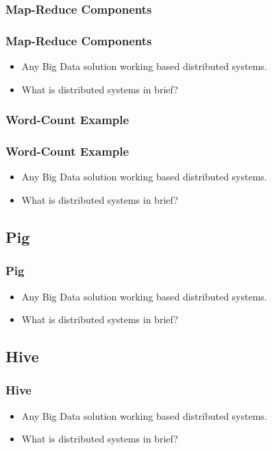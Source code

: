 
\subsubsection{Map-Reduce Components}
\begin{frame}
\frametitle{Map-Reduce Components}
\begin{itemize}[<+->]
	\item Any Big Data solution working based distributed systems.
	\item What is distributed systems in brief?
\end{itemize}
\end{frame}


\subsubsection{Word-Count Example}
\begin{frame}
\frametitle{Word-Count Example}
\begin{itemize}[<+->]
	\item Any Big Data solution working based distributed systems.
	\item What is distributed systems in brief?
\end{itemize}
\end{frame}


\subsection{Pig}
\begin{frame}
\frametitle{Pig}
\begin{itemize}[<+->]
	\item Any Big Data solution working based distributed systems.
	\item What is distributed systems in brief?
\end{itemize}
\end{frame}


\subsection{Hive}
\begin{frame}
\frametitle{Hive}
\begin{itemize}[<+->]
	\item Any Big Data solution working based distributed systems.
	\item What is distributed systems in brief?
\end{itemize}
\end{frame}



